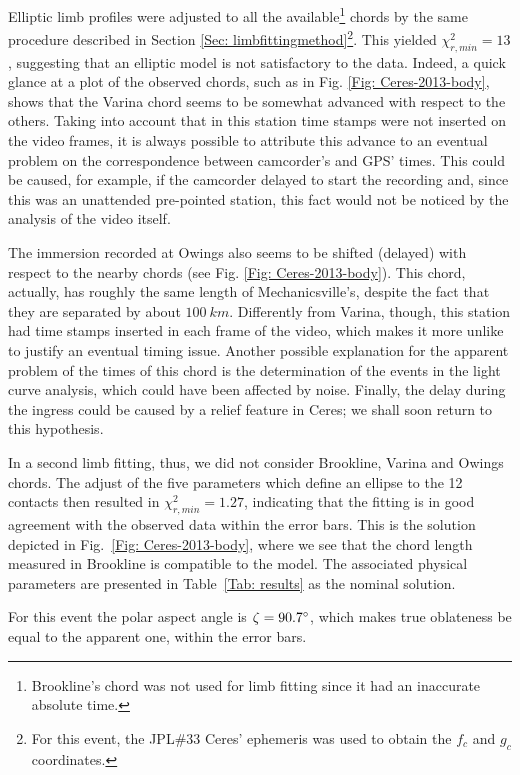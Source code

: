 \documentclass[useAMS,usenatbib]{mn2e}
\begin{document}
Elliptic limb profiles were adjusted to all the available\footnote{Brookline's chord was not used for limb fitting since it had an inaccurate absolute time.} chords by the same procedure described in Section \ref{Sec: limbfittingmethod}\footnote{For this event, the JPL\#33 Ceres' ephemeris was used to obtain the $f_{c}$ and $g_{c}$ coordinates.}. This yielded $\chi^2_{r,min} = 13$, suggesting that an elliptic model is not satisfactory to the data. Indeed, a quick glance at a plot of the observed chords, such as in Fig. \ref{Fig: Ceres-2013-body}, shows that the Varina chord seems to be somewhat advanced with respect to the others. Taking into account that in this station time stamps were not inserted on the video frames, it is always possible to attribute this advance to an eventual problem on the correspondence between camcorder's and GPS' times. This could be caused, for example, if the camcorder delayed to start the recording and, since this was an unattended pre-pointed station, this fact would not be noticed by the analysis of the video itself.

The immersion recorded at Owings also seems to be shifted (delayed) with respect to the nearby chords (see Fig. \ref{Fig: Ceres-2013-body}). This chord, actually, has roughly the same length of Mechanicsville's, despite the fact that they are separated by about $100~km$. Differently from Varina, though, this station had time stamps inserted in each frame of the video, which makes it more unlike to justify an eventual timing issue. Another possible explanation for the apparent problem of the times of this chord is the determination of the events in the light curve analysis, which could have been affected by noise. Finally, the delay during the ingress could be caused by a relief feature in Ceres; we shall soon return to this hypothesis.

In a second limb fitting, thus, we did not consider Brookline, Varina and Owings chords. The adjust of the five parameters which define an ellipse to the 12 contacts then resulted in $\chi^2_{r,min} = 1.27$, indicating that the fitting is in good agreement with the observed data within the error bars. This is the solution depicted in Fig.~\ref{Fig: Ceres-2013-body}, where we see that the chord length measured in Brookline is compatible to the model. The associated physical parameters are presented in Table~\ref{Tab: results} as the nominal solution.

For this event the polar aspect angle is $\zeta = 90.7\hbox{$^\circ$}$, which makes true oblateness be equal to the apparent one, within the error bars.
\end{document}
